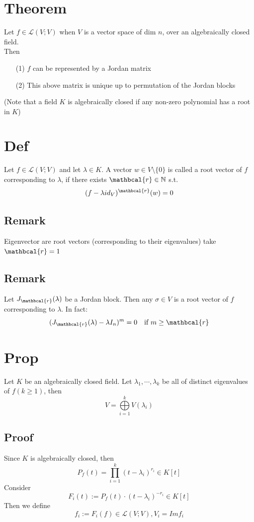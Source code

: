 \documentclass{book}
\begin{document}
\section{Theorem}Let $f\in\mathscr{L}(V;V)$ when $V$ is a vector space of dim $n$, over an algebraically closed field.\\Then
\begin{itemize}
    \item [(1)]$f$ can be represented by a Jordan matrix
    \item [(2)]This above matrix is unique up to permutation of the Jordan blocks
\end{itemize}


(Note that a field $K$ is algebraically closed if any non-zero polynomial has a root in $K$)
\section{Def}
Let $f\in\mathscr{L}(V;V)$ and let $\lambda\in K$. A vector $w\in V\setminus\{0\}$ is called a root vector of $f$ corresponding to $\lambda$, if there exists $\mathbcal{r}\in\mathbb{N}$ s.t. $$(f-\lambda id_V)^\mathbcal{r}(w)=0$$
\subsection*{Remark}
Eigenvector are root vectors (corresponding to their eigenvalues) take $\mathbcal{r}=1$

\subsection*{Remark}
Let $J_\mathbcal{r}(\lambda)$ be a Jordan block. Then any $\sigma\in V$ is a root vector of $f$ corresponding to $\lambda$. In fact:
$$(J_\mathbcal{r}(\lambda)-\lambda I_n)^m=0\quad\text{if }m\geq\mathbcal{r}$$
\section{Prop}
\label{Prop 48.27}
Let $K$ be an algebraically closed field. Let $\lambda_1,\cdots,\lambda_k$ be all of distinct eigenvalues of $f(k\geq1)$, then 
$$V=\bigoplus\limits_{i=1}^kV(\lambda_i)$$
\subsection*{Proof}
Since $K$ is algebraically closed, then
$$P_f(t)=\prod\limits_{i=1}^k(t-\lambda_i)^{r_i}\in K[t]$$
Consider $$F_i(t):=P_f(t)\cdot(t-\lambda_i)^{-r_i}\in K[t]$$
Then we define $$f_i:=F_i(f)\in\mathscr{L}(V;V),V_i=Im f_i$$
\end{document}
